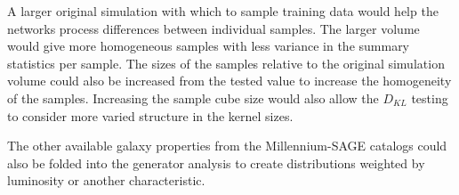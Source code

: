 \documentclass[twocolumn]{article}
\numberwithin{equation}{section}
\begin{document}
A larger original simulation with which to sample training data would help the networks process differences between 
individual samples. The larger volume would give more homogeneous samples with less variance in the summary statistics 
per sample. 
The sizes of the samples relative to the original simulation volume could also be increased from the tested value to
increase the homogeneity of the samples. Increasing the sample cube size would also allow the $D_{KL}$ testing to consider
more varied structure in the kernel sizes. 


The other available galaxy properties from the Millennium-SAGE catalogs could also be folded into the generator analysis
to create distributions weighted by luminosity or another characteristic. 

\end{document}
